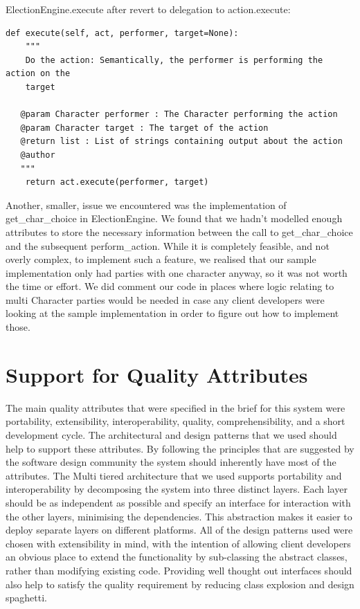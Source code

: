 \documentclass[11pt]{report}
\begin{document}
ElectionEngine.execute after revert to delegation to action.execute:

\begin{verbatim}
def execute(self, act, performer, target=None):
    """
    Do the action: Semantically, the performer is performing the action on the
    target

   @param Character performer : The Character performing the action
   @param Character target : The target of the action
   @return list : List of strings containing output about the action
   @author
   """
    return act.execute(performer, target)
\end{verbatim}

Another, smaller, issue we encountered was the implementation of get\_char\_choice in ElectionEngine. We found that we hadn’t modelled enough attributes to store the necessary information between the call to get\_char\_choice and the subsequent perform\_action. While it is completely feasible, and not overly complex, to implement such a feature, we realised that our sample implementation only had parties with one character anyway, so it was not worth the time or effort. We did comment our code in places where logic relating to multi Character parties would be needed in case any client developers were looking at the sample implementation in order to figure out how to implement those.

\section{Support for Quality Attributes}
The main quality attributes that were specified in the brief for this system were portability, extensibility, interoperability, quality, comprehensibility, and a short development cycle. The architectural and design patterns that we used should help to support these attributes. By following the principles that are suggested by the software design community the system should inherently have most of the attributes. The Multi tiered architecture that we used supports portability and interoperability by decomposing the system into three distinct layers. Each layer should be as independent as possible and specify an interface for interaction with the other layers, minimising the dependencies. This abstraction makes it easier to deploy separate layers on different platforms. All of the design patterns used were chosen with extensibility in mind, with the intention of allowing client developers an obvious place to extend the functionality by sub-classing the abstract classes, rather than modifying existing code. Providing well thought out interfaces should also help to satisfy the quality requirement by reducing class explosion and design spaghetti.
\end{document}
